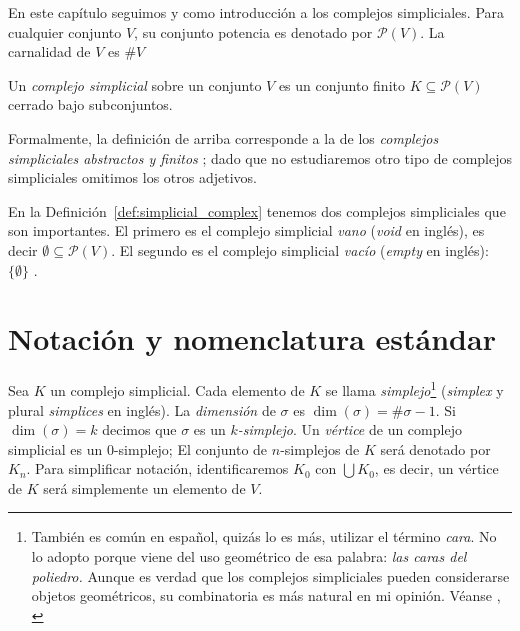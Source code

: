 \documentclass{standalone}
\begin{document}
	En este capítulo seguimos \cite{alberto:2023} y \cite{kozlov:2008:combinatorial:alg:topo} como introducción a los complejos simpliciales.
	\noindent Para cualquier conjunto $V$, su conjunto potencia es denotado por $\mathcal{P}(V)$. La carnalidad de $V$ es $\# V$
	
	\begin{definition}\label{def:simplicial_complex}
		Un \emph{complejo simplicial} sobre un conjunto $V$ es un conjunto finito $K\subseteq\mathcal{P}(V)$ cerrado bajo subconjuntos.
	\end{definition}
	
	Formalmente, la definición de arriba corresponde a la de los \emph{complejos simpliciales abstractos y finitos} \cite[Definition 2.1]{kozlov:2008:combinatorial:alg:topo}; dado que no estudiaremos otro tipo de complejos simpliciales omitimos los otros adjetivos. 
	
	\begin{remark}\label{rem:empty_complexes}
		En la Definición~\ref{def:simplicial_complex} tenemos dos complejos simpliciales que son importantes. El primero es el complejo simplicial \emph{vano} (\emph{void} en inglés), es decir $\emptyset\subseteq\mathcal{P}(V)$. El segundo es el complejo simplicial \emph{vacío} (\emph{empty} en inglés): $\{\emptyset\}$ \cite[Remark 2.3]{kozlov:2008:combinatorial:alg:topo}. 
	\end{remark}
	
	\section{Notación y nomenclatura estándar}
	
	\noindent Sea $K$ un complejo simplicial. Cada elemento de $K$ se llama \emph{simplejo}\footnote{También es común en español, quizás lo es más, utilizar el término \emph{cara}. No lo adopto porque viene del uso geométrico de esa palabra: \textit{las caras del poliedro.} Aunque es verdad que los complejos simpliciales pueden considerarse objetos geométricos, su combinatoria es más natural en mi opinión. Véanse \cite{kozlov:2008:combinatorial:alg:topo}, \cite{may:1967:simplicial}} (\emph{simplex} y plural \emph{simplices} en inglés). La \emph{dimensión} de $\sigma$ es $\dim(\sigma)=\#\sigma-1$. Si $\dim(\sigma)=k$ decimos que $\sigma$ es un \emph{$k$-simplejo}. Un \emph{vértice} de un complejo simplicial es un $0$-simplejo; El conjunto de  $n$-simplejos de $K$ será denotado por $K_{n}$. Para simplificar notación, identificaremos $K_{0}$ con $\bigcup K_{0}$, es decir, un vértice de $K$ será simplemente un elemento de $V$.
	
\end{document}
